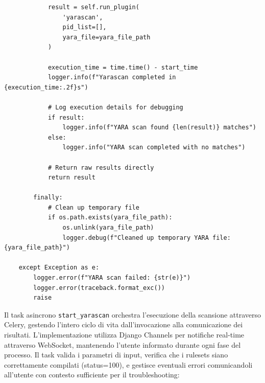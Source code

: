 \begin{verbatim}
            result = self.run_plugin(
                'yarascan',
                pid_list=[],
                yara_file=yara_file_path
            )
            
            execution_time = time.time() - start_time
            logger.info(f"Yarascan completed in {execution_time:.2f}s")
            
            # Log execution details for debugging
            if result:
                logger.info(f"YARA scan found {len(result)} matches")
            else:
                logger.info("YARA scan completed with no matches")
            
            # Return raw results directly
            return result
            
        finally:
            # Clean up temporary file
            if os.path.exists(yara_file_path):
                os.unlink(yara_file_path)
                logger.debug(f"Cleaned up temporary YARA file: {yara_file_path}")
                
    except Exception as e:
        logger.error(f"YARA scan failed: {str(e)}")
        logger.error(traceback.format_exc())
        raise
\end{verbatim}

Il task asincrono \texttt{start\_yarascan} orchestra l'esecuzione della scansione attraverso Celery, gestendo l'intero ciclo di vita dall'invocazione alla comunicazione dei risultati. L'implementazione utilizza Django Channels per notifiche real-time attraverso WebSocket, mantenendo l'utente informato durante ogni fase del processo. Il task valida i parametri di input, verifica che i rulesets siano correttamente compilati (status=100), e gestisce eventuali errori comunicandoli all'utente con contesto sufficiente per il troubleshooting:

